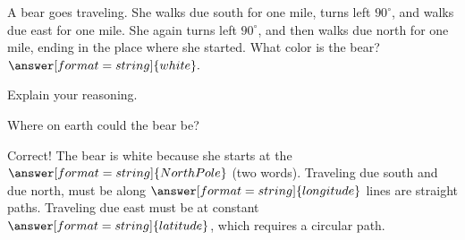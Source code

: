 \documentclass{ximera}
\begin{document}
\begin{problem}
A bear goes traveling.  She walks due south for one mile, turns left $90^\circ$, and walks due east for one mile.  She again turns left $90^\circ$, and then walks due north for one mile, ending in the place where she started.  What color is the bear?  $\answer[format=string]{white}.$

Explain your reasoning.  
\begin{hint}
Where on earth could the bear be?  
\end{hint}

\begin{problem}
Correct!  The bear is white because she starts at the $\answer[format=string]{North Pole}$ (two words).  Traveling due south and due north, must be along 
$\answer[format=string]{longitude}$ lines are straight paths.  Traveling due east must be at constant $\answer[format=string]{latitude}$, which requires a circular path.  
\end{problem}
\end{problem}
\end{document}
